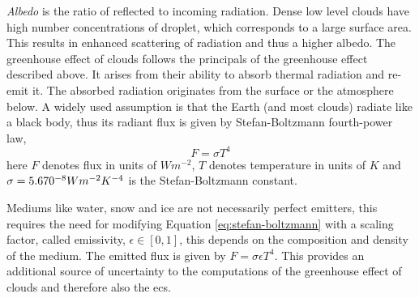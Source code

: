 \textit{Albedo} is the ratio of reflected to incoming radiation. Dense low level clouds have high number concentrations of droplet, which corresponds to a large surface area. This results in enhanced scattering of radiation and thus a higher albedo. The greenhouse effect of clouds follows the principals of the greenhouse effect described above. It arises from their ability to absorb thermal radiation and re-emit it. The absorbed radiation originates from the surface or the atmosphere below. A widely used assumption is that the Earth (and most clouds) radiate like a black body, thus its radiant flux is given by Stefan-Boltzmann fourth-power law, 
\begin{equation} \label{eq:stefan-boltzmann}
    F = \sigma T ^4 %
\end{equation}
here $F$ denotes flux in units of $W m^{-2}$, $T$ denotes temperature in units of $K$ and \\  $\sigma = 5.670 \time 10^{-8} W m^{-2} K^{-4}$ is the Stefan-Boltzmann constant. 


Mediums like water, snow and ice are not necessarily perfect emitters, this requires the need for modifying Equation \eqref{eq:stefan-boltzmann} with a scaling factor, called emissivity, $\epsilon \in [0, 1]$,
this depends on the composition and density of the medium. The emitted flux is given by $ F = \sigma \epsilon T ^4$. This provides an additional source of uncertainty to the computations of the greenhouse effect of clouds and therefore also the \acrshort{ecs}.

